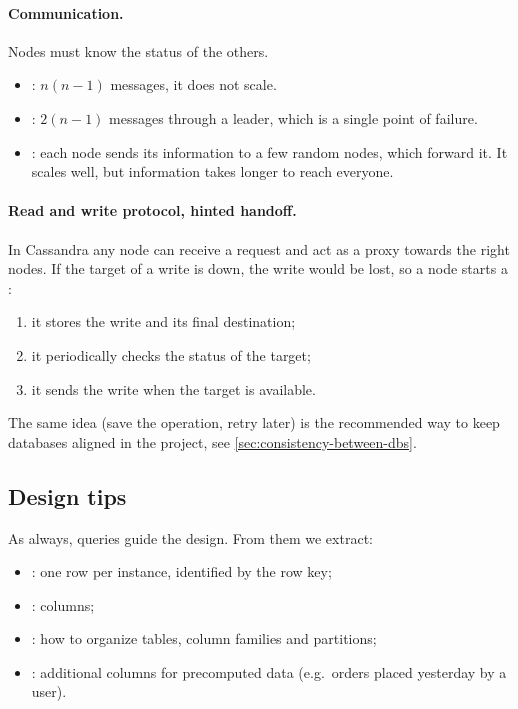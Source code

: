 \paragraph{Communication.} Nodes must know the status of the others.
\begin{itemize}
  \item {}: $n(n-1)$ messages, it does not scale.
  \item {}: $2(n-1)$ messages through a leader, which is a single point of failure.
  \item {}: each node sends its information to a few random nodes, which forward it. It scales well, but information takes longer to reach everyone.
\end{itemize}

\paragraph{Read and write protocol, hinted handoff.} In Cassandra any node can receive a request and act as a proxy towards the right nodes. If the target of a write is down, the write would be lost, so a node starts a :
\begin{enumerate}
  \item it stores the write and its final destination;
  \item it periodically checks the status of the target;
  \item it sends the write when the target is available.
\end{enumerate}

\begin{remark}
The same idea (save the operation, retry later) is the recommended way to keep  databases aligned in the project, see \cref{sec:consistency-between-dbs}.
\end{remark}

\subsection{Design tips}
As always, queries guide the design. From them we extract:
\begin{itemize}
  \item {}: one row per instance, identified by the row key;
  \item {}: columns;
  \item {}: how to organize tables, column families and partitions;
  \item {}: additional columns for precomputed data (e.g.\ orders placed yesterday by a user).
\end{itemize}

